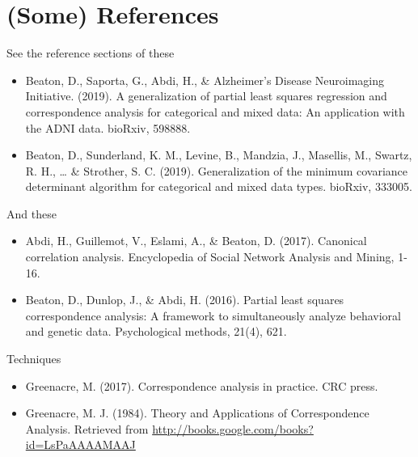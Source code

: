 \documentclass[
  ignorenonframetext,
]{beamer}
\begin{document}
\hypertarget{some-references}{%
\section{(Some) References}\label{some-references}}

\begin{frame}{See the reference sections of these}
\protect\hypertarget{see-the-reference-sections-of-these}{}

\begin{itemize}[<+->]
\item
  Beaton, D., Saporta, G., Abdi, H., \& Alzheimer's Disease Neuroimaging
  Initiative. (2019). A generalization of partial least squares
  regression and correspondence analysis for categorical and mixed data:
  An application with the ADNI data. bioRxiv, 598888.
\item
  Beaton, D., Sunderland, K. M., Levine, B., Mandzia, J., Masellis, M.,
  Swartz, R. H., \ldots{} \& Strother, S. C. (2019). Generalization of
  the minimum covariance determinant algorithm for categorical and mixed
  data types. bioRxiv, 333005.
\end{itemize}

\end{frame}

\begin{frame}{And these}
\protect\hypertarget{and-these}{}

\begin{itemize}[<+->]
\item
  Abdi, H., Guillemot, V., Eslami, A., \& Beaton, D. (2017). Canonical
  correlation analysis. Encyclopedia of Social Network Analysis and
  Mining, 1-16.
\item
  Beaton, D., Dunlop, J., \& Abdi, H. (2016). Partial least squares
  correspondence analysis: A framework to simultaneously analyze
  behavioral and genetic data. Psychological methods, 21(4), 621.
\end{itemize}

\end{frame}

\begin{frame}{Techniques}
\protect\hypertarget{techniques}{}

\begin{itemize}[<+->]
\item
  Greenacre, M. (2017). Correspondence analysis in practice. CRC press.
\item
  Greenacre, M. J. (1984). Theory and Applications of Correspondence
  Analysis. Retrieved from
  \url{http://books.google.com/books?id=LsPaAAAAMAAJ}
\end{itemize}

\end{frame}
\end{document}
